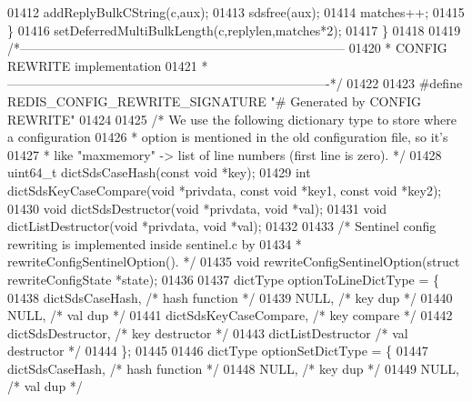 \begin{DoxyCode}
{{{{{{{{{{{{{{01412         addReplyBulkCString(c,aux);
01413         sdsfree(aux);
01414         matches++;
01415     \}
01416     setDeferredMultiBulkLength(c,replylen,matches*2);
01417 \}
01418 
01419 \textcolor{comment}{/*-----------------------------------------------------------------------------}
01420 \textcolor{comment}{ * CONFIG REWRITE implementation}
01421 \textcolor{comment}{ *----------------------------------------------------------------------------*/}
01422 
01423 \textcolor{preprocessor}{#}\textcolor{preprocessor}{define} \textcolor{preprocessor}{REDIS\_CONFIG\_REWRITE\_SIGNATURE} \textcolor{stringliteral}{"# Generated by CONFIG REWRITE"}
01424 
01425 \textcolor{comment}{/* We use the following dictionary type to store where a configuration}
01426 \textcolor{comment}{ * option is mentioned in the old configuration file, so it's}
01427 \textcolor{comment}{ * like "maxmemory" -> list of line numbers (first line is zero). */}
01428 uint64\_t dictSdsCaseHash(\textcolor{keyword}{const} \textcolor{keywordtype}{void} *key);
01429 \textcolor{keywordtype}{int} dictSdsKeyCaseCompare(\textcolor{keywordtype}{void} *privdata, \textcolor{keyword}{const} \textcolor{keywordtype}{void} *key1, \textcolor{keyword}{const} \textcolor{keywordtype}{void} *key2);
01430 \textcolor{keywordtype}{void} dictSdsDestructor(\textcolor{keywordtype}{void} *privdata, \textcolor{keywordtype}{void} *val);
01431 \textcolor{keywordtype}{void} dictListDestructor(\textcolor{keywordtype}{void} *privdata, \textcolor{keywordtype}{void} *val);
01432 
01433 \textcolor{comment}{/* Sentinel config rewriting is implemented inside sentinel.c by}
01434 \textcolor{comment}{ * rewriteConfigSentinelOption(). */}
01435 \textcolor{keywordtype}{void} rewriteConfigSentinelOption(\textcolor{keyword}{struct} rewriteConfigState *state);
01436 
01437 dictType optionToLineDictType = \{
01438     dictSdsCaseHash,            \textcolor{comment}{/* hash function */}
01439     NULL,                       \textcolor{comment}{/* key dup */}
01440     NULL,                       \textcolor{comment}{/* val dup */}
01441     dictSdsKeyCaseCompare,      \textcolor{comment}{/* key compare */}
01442     dictSdsDestructor,          \textcolor{comment}{/* key destructor */}
01443     dictListDestructor          \textcolor{comment}{/* val destructor */}
01444 \};
01445 
01446 dictType optionSetDictType = \{
01447     dictSdsCaseHash,            \textcolor{comment}{/* hash function */}
01448     NULL,                       \textcolor{comment}{/* key dup */}
01449     NULL,                       \textcolor{comment}{/* val dup */}
}}}}}}}}}}}}}}
\end{DoxyCode}
